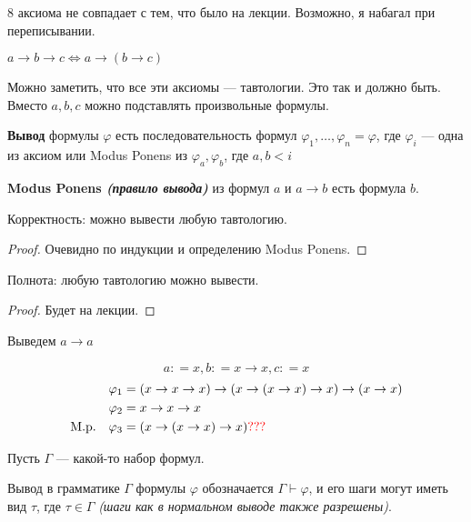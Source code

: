 \begin{remark}
    8 аксиома не совпадает с тем, что было на лекции. Возможно, я набагал при переписывании. %
\end{remark}

\begin{remark}
    \(a \to b \to c \Leftrightarrow a \to (b \to c)\)
\end{remark}

Можно заметить, что все эти аксиомы --- тавтологии. Это так и должно быть. Вместо \(a, b, c\) можно подставлять произвольные формулы.

\begin{definition}
    \textbf{Вывод} формулы \(\varphi\) есть последовательность формул \(\varphi_1, \dots , \varphi_n = \varphi\), где \(\varphi_i\) --- одна из аксиом или Modus Ponens из \(\varphi_a, \varphi_b\), где \(a, b < i\)
\end{definition}

\begin{definition}
    \textbf{Modus Ponens \textit{(правило вывода)}} из формул \(a\) и \(a \to b\) есть формула \(b\).
\end{definition}

Корректность: можно вывести любую тавтологию.
\begin{proof}
    Очевидно по индукции и определению Modus Ponens.
\end{proof}

Полнота: любую тавтологию можно вывести.
\begin{proof}
    Будет на лекции.
\end{proof}

\begin{example}
    Выведем \(a \to a\)

    \[a: = x, b: = x \to x, c : = x\]
    \begin{align*}
        \varphi_1                   & = (x \to x \to x) \to (x \to (x \to x) \to x) \to (x \to x) \\
        \varphi_2                   & = x \to x \to x                                             \\
        \text{M.p.} \quad \varphi_3 & = (x \to (x \to x) \to x) \textcolor{red}{???}                                \\
    \end{align*}
\end{example}

Пусть \(\Gamma\) --- какой-то набор формул.

\begin{definition}
    Вывод в грамматике \(\Gamma\) формулы \(\varphi\) обозначается \(\Gamma \vdash \varphi\), и его шаги могут иметь вид \(\tau\), где \(\tau\in\Gamma\) \textit{(шаги как в нормальном выводе также разрешены)}.
\end{definition}


